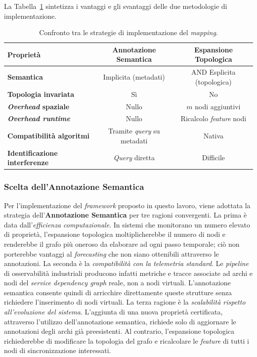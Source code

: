 La Tabella~\ref{tab:mapping_strategies} sintetizza i vantaggi e gli svantaggi delle due
metodologie di implementazione.

\begin{table}[htbp]
\centering
\caption{Confronto tra le strategie di implementazione del \textit{mapping}.}
\label{tab:mapping_strategies}
\begin{tabular}{lcc}
\toprule
\textbf{Proprietà} & \textbf{Annotazione Semantica} & \textbf{Espansione Topologica} \\
\midrule
\textbf{Semantica}                   & Implicita (metadati) & AND Esplicita (topologica) \\
\textbf{Topologia invariata}         & Sì                   & No \\
\textbf{\textit{Overhead} spaziale}  & Nullo                & $m$ nodi aggiuntivi \\
\textbf{\textit{Overhead runtime}}   & Nullo                & Ricalcolo \textit{feature} nodi \\
\textbf{Compatibilità algoritmi}     & Tramite \textit{query} su metadati & Nativa \\
\textbf{Identificazione interferenze}& \textit{Query} diretta & Difficile \\
\bottomrule
\end{tabular}
\end{table}

\subsubsection{Scelta dell'Annotazione Semantica}
\label{sec:scelta_annotazione}

Per l'implementazione del \textit{framework} proposto in questo lavoro, viene adottata la
strategia dell'\textbf{Annotazione Semantica} per tre ragioni convergenti. La prima è data
dall'\textit{efficienza computazionale}. In sistemi che monitorano un numero elevato di proprietà,
l'espansione topologica moltiplicherebbe il numero di nodi e renderebbe il grafo più oneroso da
elaborare ad ogni passo temporale; ciò non porterebbe vantaggi al \textit{forecasting} che non
siano ottenibili attraverso le annotazioni. La seconda è la \textit{compatibilità con la telemetria
standard}. Le \textit{pipeline} di osservabilità industriali producono infatti metriche e tracce
associate ad archi e nodi del \textit{service dependency graph} reale, non a nodi virtuali.
L'annotazione semantica consente quindi di arricchire direttamente queste strutture senza richiedere
l'inserimento di nodi virtuali. La terza ragione è la \textit{scalabilità rispetto all'evoluzione
del sistema}. L'aggiunta di una nuova proprietà certificata, attraverso l'utilizzo dell'annotazione
semantica, richiede solo di aggiornare le annotazioni degli archi già preesistenti. Al contrario,
l'espansione topologica richiederebbe di modificare la topologia del grafo e ricalcolare le
\textit{feature} di tutti i nodi di sincronizzazione interessati.

